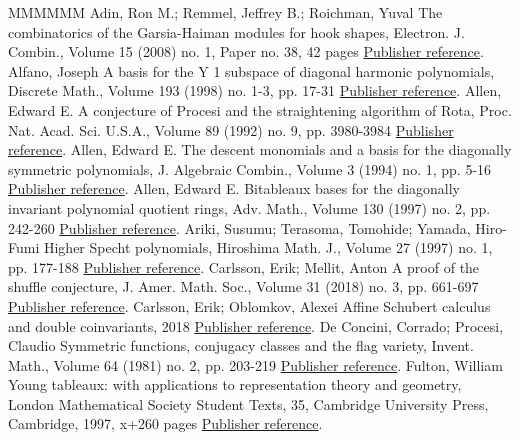 \documentclass[11pt]{article}
\theoremstyle{definition}
\numberwithin{equation}{section}
\begin{document}
\begin{thebibliography}{MMMMMM}
 Adin, Ron M.; Remmel, Jeffrey B.; Roichman, Yuval The combinatorics of the Garsia-Haiman modules for hook shapes, Electron. J. Combin., Volume 15 (2008) no. 1, Paper no. 38, 42 pages \href{https://alco.centre-mersenne.org/articles/10.5802/alco.396/#HookBases}{Publisher reference}.
 Alfano, Joseph A basis for the Y 1  subspace of diagonal harmonic polynomials, Discrete Math., Volume 193 (1998) no. 1-3, pp. 17-31 \href{https://alco.centre-mersenne.org/articles/10.5802/alco.396/#Alfano}{Publisher reference}.
 Allen, Edward E. A conjecture of Procesi and the straightening algorithm of Rota, Proc. Nat. Acad. Sci. U.S.A., Volume 89 (1992) no. 9, pp. 3980-3984 \href{https://alco.centre-mersenne.org/articles/10.5802/alco.396/#AllenOneVariable}{Publisher reference}.
 Allen, Edward E. The descent monomials and a basis for the diagonally symmetric polynomials, J. Algebraic Combin., Volume 3 (1994) no. 1, pp. 5-16 \href{https://alco.centre-mersenne.org/articles/10.5802/alco.396/#AllenDescentMonomials}{Publisher reference}.
 Allen, Edward E. Bitableaux bases for the diagonally invariant polynomial quotient rings, Adv. Math., Volume 130 (1997) no. 2, pp. 242-260 \href{https://alco.centre-mersenne.org/articles/10.5802/alco.396/#AllenBitableaux1}{Publisher reference}.
 Ariki, Susumu; Terasoma, Tomohide; Yamada, Hiro-Fumi Higher Specht polynomials, Hiroshima Math. J., Volume 27 (1997) no. 1, pp. 177-188 \href{https://alco.centre-mersenne.org/articles/10.5802/alco.396/#ATY}{Publisher reference}.
 Carlsson, Erik; Mellit, Anton A proof of the shuffle conjecture, J. Amer. Math. Soc., Volume 31 (2018) no. 3, pp. 661-697 \href{https://alco.centre-mersenne.org/articles/10.5802/alco.396/#shuffle}{Publisher reference}.
 Carlsson, Erik; Oblomkov, Alexei Affine Schubert calculus and double coinvariants, 2018 \href{https://alco.centre-mersenne.org/articles/10.5802/alco.396/#CarlssonOblomkov}{Publisher reference}.
 De Concini, Corrado; Procesi, Claudio Symmetric functions, conjugacy classes and the flag variety, Invent. Math., Volume 64 (1981) no. 2, pp. 203-219 \href{https://alco.centre-mersenne.org/articles/10.5802/alco.396/#DeConciniProcesi}{Publisher reference}.
 Fulton, William Young tableaux: with applications to representation theory and geometry, London Mathematical Society Student Texts, 35, Cambridge University Press, Cambridge, 1997, x+260 pages \href{https://alco.centre-mersenne.org/articles/10.5802/alco.396/#Fulton}{Publisher reference}.

\end{thebibliography}
\end{document}
